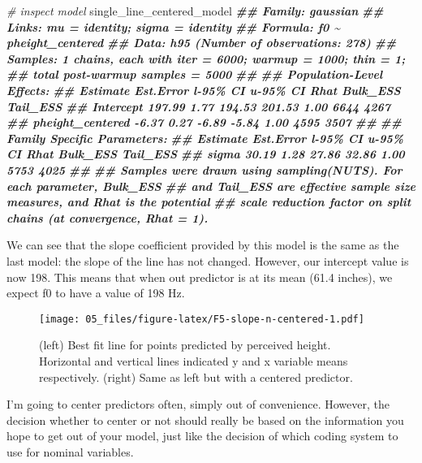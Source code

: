 \documentclass[
]{book}
\newenvironment{Shaded}{\begin{snugshade}}{\end{snugshade}}
\newcommand{\CommentTok}[1]{\textcolor[rgb]{0.56,0.35,0.01}{\textit{#1}}}
\newcommand{\DocumentationTok}[1]{\textcolor[rgb]{0.56,0.35,0.01}{\textbf{\textit{#1}}}}
\newcommand{\NormalTok}[1]{#1}
\begin{document}
\begin{Shaded}
\begin{Highlighting}[]
\CommentTok{\# inspect model}
\NormalTok{single\_line\_centered\_model}
\DocumentationTok{\#\#  Family: gaussian }
\DocumentationTok{\#\#   Links: mu = identity; sigma = identity }
\DocumentationTok{\#\# Formula: f0 \textasciitilde{} pheight\_centered }
\DocumentationTok{\#\#    Data: h95 (Number of observations: 278) }
\DocumentationTok{\#\# Samples: 1 chains, each with iter = 6000; warmup = 1000; thin = 1;}
\DocumentationTok{\#\#          total post{-}warmup samples = 5000}
\DocumentationTok{\#\# }
\DocumentationTok{\#\# Population{-}Level Effects: }
\DocumentationTok{\#\#                  Estimate Est.Error l{-}95\% CI u{-}95\% CI Rhat Bulk\_ESS Tail\_ESS}
\DocumentationTok{\#\# Intercept          197.99      1.77   194.53   201.53 1.00     6644     4267}
\DocumentationTok{\#\# pheight\_centered    {-}6.37      0.27    {-}6.89    {-}5.84 1.00     4595     3507}
\DocumentationTok{\#\# }
\DocumentationTok{\#\# Family Specific Parameters: }
\DocumentationTok{\#\#       Estimate Est.Error l{-}95\% CI u{-}95\% CI Rhat Bulk\_ESS Tail\_ESS}
\DocumentationTok{\#\# sigma    30.19      1.28    27.86    32.86 1.00     5753     4025}
\DocumentationTok{\#\# }
\DocumentationTok{\#\# Samples were drawn using sampling(NUTS). For each parameter, Bulk\_ESS}
\DocumentationTok{\#\# and Tail\_ESS are effective sample size measures, and Rhat is the potential}
\DocumentationTok{\#\# scale reduction factor on split chains (at convergence, Rhat = 1).}
\end{Highlighting}
\end{Shaded}

We can see that the slope coefficient provided by this model is the same as the last model: the slope of the line has not changed. However, our intercept value is now 198. This means that when out predictor is at its mean (61.4 inches), we expect f0 to have a value of 198 Hz.

\begin{figure}
\centering
\texttt{[image: 05\_files/figure-latex/F5-slope-n-centered-1.pdf]}
\caption{\label{fig:F5-slope-n-centered}(left) Best fit line for points predicted by perceived height. Horizontal and vertical lines indicated y and x variable means respectively. (right) Same as left but with a centered predictor.}
\end{figure}

I'm going to center predictors often, simply out of convenience. However, the decision whether to center or not should really be based on the information you hope to get out of your model, just like the decision of which coding system to use for nominal variables.
\end{document}
